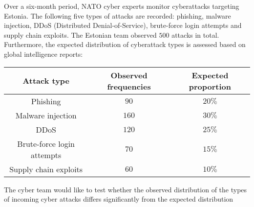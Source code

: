 \begin{enquestion}{20}{
    Over a six-month period, NATO cyber experts monitor cyberattacks targeting Estonia.
    The following five types of attacks are recorded: phishing, malware injection, DDoS (Distributed Denial-of-Service), brute-force login attempts and supply chain exploits.
    The Estonian team observed $500$ attacks in total.
    Furthermore, the expected distribution of cyberattack types is assessed based on global intelligence reports:
    \begin{center}
        \begin{tabular}{ccc}
            \toprule
                {\bfseries Attack type} & {\bfseries Observed frequencies} & {\bfseries Expected proportion}\\
            \midrule 
                Phishing & $90$ & $20\%$ \\
                Malware injection & $160$ & $30\%$ \\
                DDoS & $120$ & $25\%$ \\
                Brute-force login attempts & $70$ & $15\%$ \\
                Supply chain exploits & $60$ & $10\%$ \\
            \bottomrule
        \end{tabular}
    \end{center}
    The cyber team would like to test whether the observed distribution of the types of incoming cyber attacks differs significantly from the expected distribution
}



\end{enquestion}
